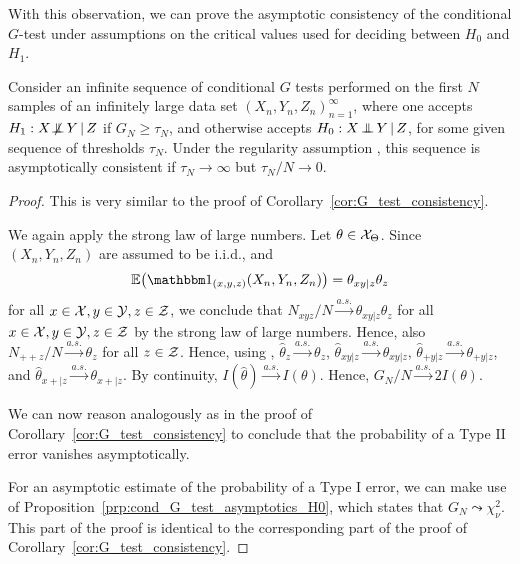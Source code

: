 With this observation, we can prove the asymptotic consistency of the conditional $G$-test under assumptions on the critical values used
for deciding between $H_0$ and $H_1$.
\begin{Cor}\label{cor:cond_G_test_consistency}
Consider an infinite sequence of conditional $G$ tests performed on the first $N$ samples of an infinitely large
data set $(X_n,Y_n,Z_n)_{n=1}^\infty$,
where one accepts $H_1 : X \operatorname*{\not\mkern-2mu\perp\mkern-11mu\perp} Y \operatorname*{|} Z$ if $G_N \ge \tau_N$, and otherwise accepts $H_0 : X \operatorname*{\perp\mkern-11mu\perp} Y \operatorname*{|} Z$, 
for some given sequence of thresholds $\tau_N$.
Under the regularity assumption , this sequence is
asymptotically consistent if $\tau_N \to \infty$ but $\tau_N / N \to 0$.
\end{Cor}
\begin{proof}
This is very similar to the proof of Corollary~\ref{cor:G_test_consistency}.
  
We again apply the strong law of large numbers.
Let $\theta \in \mathcal{X}_\Theta$. Since $(X_n,Y_n,Z_n)$ are assumed to be i.i.d., and 
  $$\Exp \big(\I_{(x,y,z)}(X_n,Y_n,Z_n)\big) = \theta_{xy|z}\theta_z$$
for all $x \in \mathcal{X}, y \in \mathcal{Y}, z \in \mathcal{Z}$,
we conclude that $N_{xyz} / N \stackrel{a.s.}{\to} \theta_{xy|z} \theta_z$ for all $x \in \mathcal{X}, y \in \mathcal{Y}, z\in \mathcal{Z}$
by the strong law of large numbers. Hence, also $N_{+ + z} / N \stackrel{a.s.}{\to} \theta_z$ for all $z \in \mathcal{Z}$.
Hence, using ,
$\hat\theta_z \stackrel{a.s.}{\to} \theta_z$,
$\hat\theta_{xy|z} \stackrel{a.s.}{\to} \theta_{xy|z}$,
$\hat\theta_{+ y|z} \stackrel{a.s.}{\to} \theta_{+ y|z}$, and
$\hat\theta_{x +|z} \stackrel{a.s.}{\to} \theta_{x +|z}$.
By continuity, $I(\hat\theta) \stackrel{a.s.}{\to} I(\theta)$.
Hence, $G_N / N \stackrel{a.s.}{\to} 2I(\theta)$. 
  
We can now reason analogously as in the proof of 
Corollary~\ref{cor:G_test_consistency} to conclude that
the probability of a Type II error vanishes asymptotically.

For an asymptotic estimate of the probability of a Type I error,
we can make use of Proposition~\ref{prp:cond_G_test_asymptotics_H0},
which states that $G_N \leadsto \chi_{\nu}^2$. 
This part of the proof is identical to the corresponding part of the proof of Corollary~\ref{cor:G_test_consistency}.
\end{proof}
